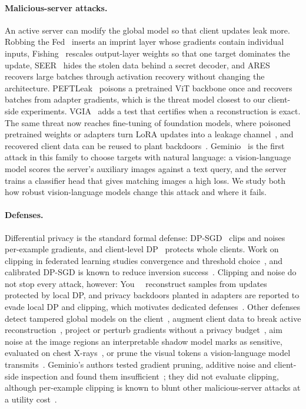 \paragraph{Malicious-server attacks.}
An active server can modify the global model so that client updates leak more.
Robbing the Fed~\cite{robbing2022} inserts an imprint layer whose gradients contain individual inputs, Fishing~\cite{fishing2023} rescales output-layer weights so that one target dominates the update, SEER~\cite{garov2024seer} hides the stolen data behind a secret decoder, and ARES~\cite{ares2026} recovers large batches through activation recovery without changing the architecture.
PEFTLeak~\cite{sami2025peftleak} poisons a pretrained ViT backbone once and recovers batches from adapter gradients, which is the threat model closest to our client-side experiments.
VGIA~\cite{vgia2026} adds a test that certifies when a reconstruction is exact.
The same threat now reaches fine-tuning of foundation models, where poisoned pretrained weights or adapters turn LoRA updates into a leakage channel~\cite{minegrad2026,neuroimprint2026}, and recovered client data can be reused to plant backdoors~\cite{aggregatorcheats2026}.
Geminio~\cite{geminio2024} is the first attack in this family to choose targets with natural language: a vision-language model scores the server's auxiliary images against a text query, and the server trains a classifier head that gives matching images a high loss.
We study both how robust vision-language models change this attack and where it fails.

\paragraph{Defenses.}
Differential privacy is the standard formal defense: DP-SGD~\cite{dpsgd2016} clips and noises per-example gradients, and client-level DP~\cite{mcmahan2018learning} protects whole clients.
Work on clipping in federated learning studies convergence and threshold choice~\cite{zhang2021clipping,andrew2021adaptive,dpsfl2024}, and calibrated DP-SGD is known to reduce inversion success~\cite{dp_gia_eval2025}.
Clipping and noise do not stop every attack, however: You~\etal~\cite{you2025ldp} reconstruct samples from updates protected by local DP, and privacy backdoors planted in adapters are reported to evade local DP and clipping, which motivates dedicated defenses~\cite{trishield2026}.
Other defenses detect tampered global models on the client~\cite{carletti2026detect}, augment client data to break active reconstruction~\cite{oasis2026}, project or perturb gradients without a privacy budget~\cite{svdefense2025,cvb2023,tip2026}, aim noise at the image regions an interpretable shadow model marks as sensitive, evaluated on chest X-rays~\cite{shadow2025}, or prune the visual tokens a vision-language model transmits~\cite{qprivvl2026}.
Geminio's authors tested gradient pruning, additive noise and client-side inspection and found them insufficient~\cite{geminio2024}; they did not evaluate clipping, although per-example clipping is known to blunt other malicious-server attacks at a utility cost~\cite{garov2024seer}.

